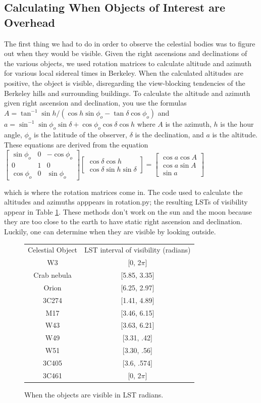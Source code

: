 \documentclass[11pt]{article}
\newcommand{\inv}{^{-1}}
\begin{document}
\subsection{Calculating When Objects of Interest are Overhead}
The first thing we had to do in order to observe the celestial bodies was to figure out when they would be visible. Given the right ascensions and declinations of the various objects, we used rotation matrices to calculate altitude and azimuth for various local sidereal times in Berkeley. When the calculated altitudes are positive, the object is visible, disregarding the view-blocking tendencies of the Berkeley hills and surrounding buildings. To calculate the altitude and azimuth given right ascension and declination, you use the formulas $A = \tan\inv{\sin{h}/(\cos{h}\sin{\phi_o} - \tan{\delta}\cos{\phi_o})}$ and $a = \sin\inv{\sin{\phi_o}\sin{\delta} + \cos{\phi_o}\cos{\delta}\cos{h}}$ where $A$ is the azimuth, $h$ is the hour angle, $\phi_o$ is the latitude of the observer, $\delta$ is the declination, and $a$ is the altitude. These equations are derived from the equation 
$\begin{bmatrix}
\sin{\phi_o} & 0 & -\cos{\phi_o} \\
0 & 1 & 0 \\
\cos{\phi_o} & 0 & \sin{\phi_o}
\end{bmatrix}
\begin{bmatrix}
\cos{\delta}\cos{h} \\
\cos{\delta}\sin{h}
\sin{\delta}
\end{bmatrix}
=
\begin{bmatrix} 
\cos{a}\cos{A} \\
\cos{a}\sin{A} \\
\sin{a}
\end{bmatrix}$

which is where the rotation matrices come in. The code used to calculate the altitudes and azimuths apppears in rotation.py; the resulting LSTs of visibility appear in Table \ref{lsts}. These methods don't work on the sun and the moon because they are too close to the earth to have static right ascension and declination. Luckily, one can determine when they are visible by looking outside.

\begin{figure}
\centering
\begin{tabular}{c|c}
Celestial Object & LST interval of visibility (radians) \\
W3 & [0, 2$\pi$] \\
Crab nebula & [5.85, 3.35] \\
Orion & [6.25, 2.97] \\
3C274 & [1.41, 4.89] \\
M17 & [3.46, 6.15] \\
W43 & [3.63, 6.21] \\
W49 & [3.31, .42] \\
W51 & [3.30, .56] \\
3C405 & [3.6, .574] \\
3C461 & [0, 2$\pi$]
\end{tabular}
\caption{When the objects are visible in LST radians. \label{lsts}}
\end{figure}
\end{document}
